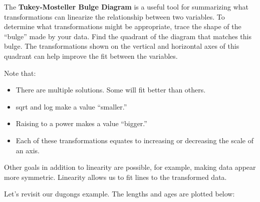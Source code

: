 \documentclass[
  letterpaper,
  DIV=11,
  numbers=noendperiod]{scrreprt}
\providecommand{\tightlist}{%
  \setlength{\itemsep}{0pt}\setlength{\parskip}{0pt}}\usepackage{longtable,booktabs,array}
\begin{document}
The \textbf{Tukey-Mosteller Bulge Diagram} is a useful tool for
summarizing what transformations can linearize the relationship between
two variables. To determine what transformations might be appropriate,
trace the shape of the ``bulge'' made by your data. Find the quadrant of
the diagram that matches this bulge. The transformations shown on the
vertical and horizontal axes of this quadrant can help improve the fit
between the variables.

Note that:

\begin{itemize}
\tightlist
\item
  There are multiple solutions. Some will fit better than others.
\item
  sqrt and log make a value ``smaller.''
\item
  Raising to a power makes a value ``bigger.''
\item
  Each of these transformations equates to increasing or decreasing the
  scale of an axis.
\end{itemize}

Other goals in addition to linearity are possible, for example, making
data appear more symmetric. Linearity allows us to fit lines to the
transformed data.

Let's revisit our dugongs example. The lengths and ages are plotted
below:
\end{document}
